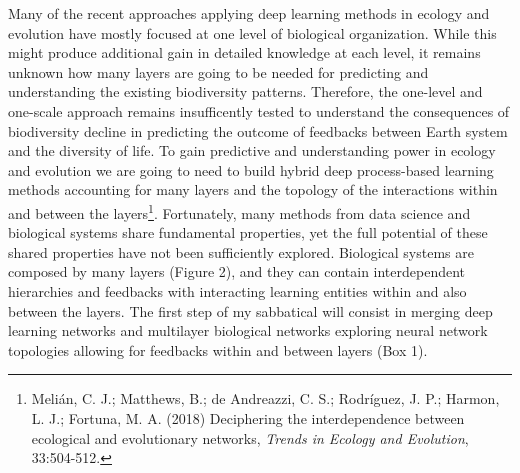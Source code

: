 \documentclass[authoryear,1p,12pt]{elsarticle}
\begin{document}
Many of the recent approaches applying deep learning methods in
ecology and evolution have mostly focused at one level of biological
organization. While this might produce additional gain in detailed
knowledge at each level, it remains unknown how many layers are going
to be needed for predicting and understanding the existing
biodiversity patterns. Therefore, the one-level and one-scale approach
remains insufficently tested to understand the consequences of
biodiversity decline in predicting the outcome of feedbacks between
Earth system and the diversity of life. To gain predictive and
understanding power in ecology and evolution we are going to need to
build hybrid deep process-based learning methods accounting for many
layers and the topology of the interactions within and between the
layers\footnote{Melián, C. J.; Matthews, B.; de Andreazzi, C. S.;
  Rodríguez, J. P.; Harmon, L. J.; Fortuna, M. A. (2018) Deciphering
  the interdependence between ecological and evolutionary networks,
  {\em Trends in Ecology and Evolution}, 33:504-512.}. Fortunately,
many methods from data science and biological systems share
fundamental properties, yet the full potential of these shared
properties have not been sufficiently explored. Biological systems are
composed by many layers (Figure 2), and they can contain
interdependent hierarchies and feedbacks with interacting learning
entities within and also between the layers. The first step of my
sabbatical will consist in merging deep learning networks and
multilayer biological networks exploring neural network topologies
allowing for feedbacks within and between layers (Box 1).
\end{document}
